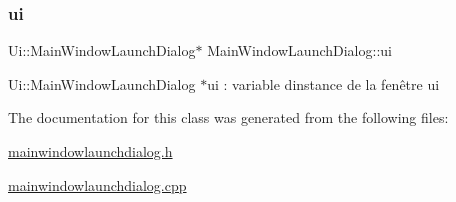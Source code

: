 \subsubsection{\texorpdfstring{ui}{ui}}
{\footnotesize\ttfamily Ui\+::\+Main\+Window\+Launch\+Dialog$\ast$ Main\+Window\+Launch\+Dialog\+::ui\hspace{0.3cm}{\ttfamily [private]}}

Ui\+::\+Main\+Window\+Launch\+Dialog $\ast$ui \+: variable d\textquotesingle{}instance de la fenêtre ui 

The documentation for this class was generated from the following files\+:\begin{DoxyCompactItemize}
\item 
\hyperlink{mainwindowlaunchdialog_8h}{mainwindowlaunchdialog.\+h}\item 
\hyperlink{mainwindowlaunchdialog_8cpp}{mainwindowlaunchdialog.\+cpp}\end{DoxyCompactItemize}
